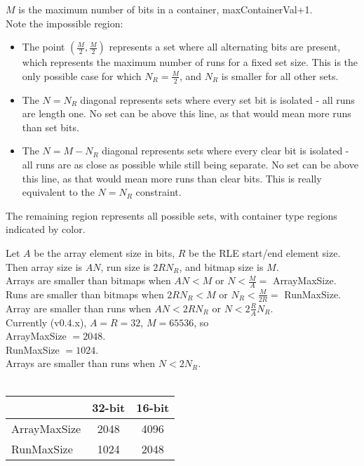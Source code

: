 \documentclass{article} %
\begin{document}
$M$ is the maximum number of bits in a container, maxContainerVal+1.\\

Note the impossible region:
\begin{itemize}
  \item The point $(\frac{M}{2}, \frac{M}{2})$ represents a set where all alternating bits are
present, which represents the maximum number of runs for a fixed set size. This is the only possible case for which $N_R = \frac{M}{2}$, and $N_R$ is smaller for all other sets.
  \item The $N = N_R$ diagonal represents sets where every set bit is isolated - all runs are length one. No set can be above this line, as that would mean more runs than set bits.
  \item The $N = M-N_R$ diagonal represents sets where every clear bit is isolated - all runs are as close as possible while still being separate. No set can be above this line, as that would mean more runs than clear bits. This is really equivalent to the $N=N_R$ constraint.

\end{itemize}

The remaining region represents all possible sets,
with container type regions indicated by color.

\bigskip

Let $A$ be the array element size in bits, $R$ be the RLE start/end element size. Then array size is $AN$, run size is
$2RN_R$, and bitmap size is $M$.\\

Arrays are smaller than bitmaps when $AN < M$ or $N < \frac{M}{A} = $ ArrayMaxSize.\\
Runs are smaller than bitmaps when $2RN_R < M$ or $N_R < \frac{M}{2R} = $ RunMaxSize.\\
Array are smaller than runs when $AN < 2RN_R$ or $N < 2\frac{R}{A} N_R$.\\

Currently (v0.4.x), $A = R = 32$, $M = 65536$, so\\ 

ArrayMaxSize $ = 2048$.\\
RunMaxSize $ = 1024$.\\
Arrays are smaller than runs when $N < 2 N_R$.\\
\\
\begin{tabular}{l | c | c}
    & 32-bit & 16-bit \\
  \hline
  ArrayMaxSize & 2048 & 4096 \\
  \hline
  RunMaxSize & 1024 & 2048 \\
\end{tabular}
\end{document}
